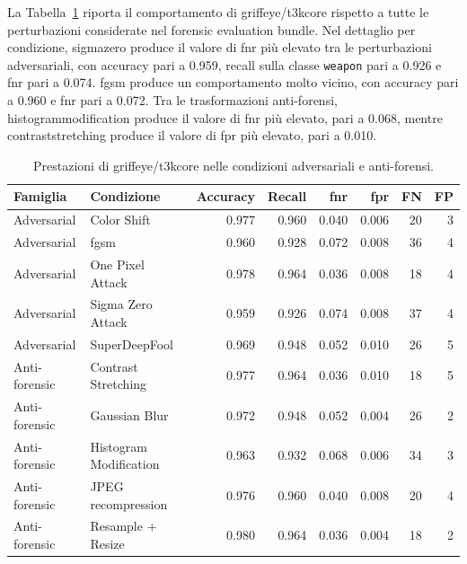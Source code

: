 La Tabella~\ref{tab:results-griffeye-attack-metrics} riporta il comportamento di
\gls{griffeye}/\gls{t3kcore} rispetto a tutte le perturbazioni considerate nel
forensic evaluation bundle. Nel dettaglio per condizione, \gls{sigmazero} produce il valore di \gls{fnr}
più elevato tra le perturbazioni adversariali, con accuracy pari a 0.959,
recall sulla classe \texttt{weapon} pari a 0.926 e \gls{fnr} pari a 0.074. \gls{fgsm}
produce un comportamento molto vicino, con accuracy pari a 0.960 e \gls{fnr}
pari a 0.072. Tra le trasformazioni anti-forensi, \gls{histogrammodification} produce il
valore di \gls{fnr} più elevato, pari a 0.068, mentre
\gls{contraststretching} produce il valore di \gls{fpr} più elevato, pari a
0.010.

\begin{table}[H]
\centering
\scriptsize
\renewcommand{\arraystretch}{1.12}
\setlength{\tabcolsep}{4pt}
\caption{Prestazioni di \gls{griffeye}/\gls{t3kcore} nelle condizioni adversariali e anti-forensi.}
\label{tab:results-griffeye-attack-metrics}
\begin{tabular}{@{}llrrrrrr@{}}
\toprule
\textbf{Famiglia} &
\textbf{Condizione} &
\textbf{Accuracy} &
\textbf{Recall} &
\textbf{\gls{fnr}} &
\textbf{\gls{fpr}} &
\textbf{FN} &
\textbf{FP} \\
\midrule

Adversarial &
Color Shift &
0.977 & 0.960 & 0.040 & 0.006 & 20 & 3 \\

Adversarial &
\gls{fgsm} &
0.960 & 0.928 & 0.072 & 0.008 & 36 & 4 \\

Adversarial &
One Pixel Attack &
0.978 & 0.964 & 0.036 & 0.008 & 18 & 4 \\

Adversarial &
Sigma Zero Attack &
0.959 & 0.926 & 0.074 & 0.008 & 37 & 4 \\

Adversarial &
SuperDeepFool &
0.969 & 0.948 & 0.052 & 0.010 & 26 & 5 \\

\midrule

Anti-forensic &
Contrast Stretching &
0.977 & 0.964 & 0.036 & 0.010 & 18 & 5 \\

Anti-forensic &
Gaussian Blur &
0.972 & 0.948 & 0.052 & 0.004 & 26 & 2 \\

Anti-forensic &
Histogram Modification &
0.963 & 0.932 & 0.068 & 0.006 & 34 & 3 \\

Anti-forensic &
JPEG recompression &
0.976 & 0.960 & 0.040 & 0.008 & 20 & 4 \\

Anti-forensic &
Resample + Resize &
0.980 & 0.964 & 0.036 & 0.004 & 18 & 2 \\

\bottomrule
\end{tabular}
\end{table}

